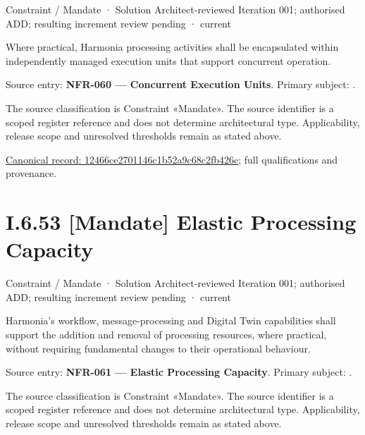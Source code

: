 \label{element:12466ce2701146c1b52a9c68c2fb426c}
{\small Constraint / Mandate · Solution Architect-reviewed Iteration 001; authorised ADD; resulting increment review pending · current}\par

Where practical, Harmonia processing activities shall be encapsulated within independently managed execution units that support concurrent operation.



Source entry: \textbf{NFR-060 — Concurrent Execution Units}. Primary subject: \texttt{}.



The source classification is Constraint «Mandate». The source identifier is a scoped register reference and does not determine architectural type. Applicability, release scope and unresolved thresholds remain as stated above.


{\footnotesize \href{../../../../continuum/motivation/constraint/mandate/12466ce2701146c1b52a9c68c2fb426c.md}{Canonical record: 12466ce2701146c1b52a9c68c2fb426c}; full qualifications and provenance.}\par
\section*{I.6.53 [Mandate] Elastic Processing Capacity}
\label{navigation:I.6.53}

\label{element:ea33d8db942f4b5b9e322d74cbfe975b}
{\small Constraint / Mandate · Solution Architect-reviewed Iteration 001; authorised ADD; resulting increment review pending · current}\par

Harmonia's workflow, message-processing and Digital Twin capabilities shall support the addition and removal of processing resources, where practical, without requiring fundamental changes to their operational behaviour.



Source entry: \textbf{NFR-061 — Elastic Processing Capacity}. Primary subject: \texttt{}.



The source classification is Constraint «Mandate». The source identifier is a scoped register reference and does not determine architectural type. Applicability, release scope and unresolved thresholds remain as stated above.


